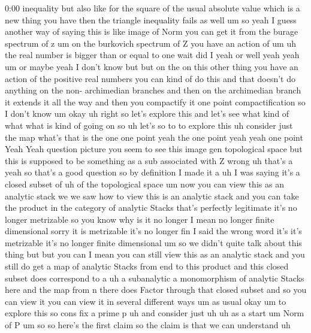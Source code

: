 \begin{unfinished}{0:00}
inequality  but  also  like  for  the  square
of  the  usual  absolute  value  which  is  a
new  thing  you  have  then  the  triangle
inequality  fails  as
well  um  so  yeah  I  guess  another  way  of
saying  this  is  like  image  of  Norm  you
can  get  it  from  the  burage  spectrum  of  z
um  on  the  burkovich  spectrum  of  Z  you
have  an  action  of
um  uh  the  real  number  is  bigger  than  or
equal  to  one  wait  did  I  yeah  or
well  yeah
yeah
um  or  maybe  yeah  I  don't  know  but  but  on
the  on  this  other  thing  you  have  an
action  of  the  positive  real  numbers  you
can  kind  of  do  this  and  that  doesn't  do
anything  on  the  non-  archimedian
branches  and  then  on  the  archimedian
branch  it  extends  it  all  the  way  and
then  you  compactify  it  one  point
compactification  so  I  don't  know
um  okay
uh  right  so  let's  explore  this  and  let's
see  what  kind
of  what  what  is  kind  of  going  on  so  uh
let's  so  to  to  explore
this  uh
consider  just  the
map  what's  that  is  the
one  one  point  yeah  the  one  point  yeah
yeah  one  point  Yeah
Yeah
question  picture  you  seem  to  see  this
image  gen  topological  space  but  this  is
supposed  to  be  something  as  a
sub  associated  with  Z  wrong  uh  that's  a
yeah  so  that's  a  good  question  so  by
definition  I  made  it  a  uh  I  was  saying
it's  a  closed  subset  of  uh  of  the
topological
space  um
now  you  can  view  this  as  an  analytic
stack  we  we  saw  how  to  view  this  is  an
analytic  stack  and  you  can  take  the
product  in  the  category  of  analytic
Stacks  that's  perfectly  legitimate  it's
no  longer  metrizable  so  you
know  why  is  it  no  longer  I  mean  no
longer  finite  dimensional  sorry  it  is
metrizable  it's  no  longer  fin  I  said  the
wrong  word  it's  it's  metrizable  it's  no
longer  finite  dimensional  um  so  we
didn't  quite  talk  about  this  thing  but
but  you  can  I  mean  you  can  still  view
this  as  an  analytic  stack  and  you  still
do  get  a  map  of  analytic  Stacks  from  end
to  this  product  and  this  closed  subset
does  correspond  to
a  uh  a  subanalytic  a  monomorphism  of
analytic  Stacks  here  and  the  map  from  n
there  does  Factor  through  that  closed
subset  and  so  you  can  view  it  you  can
view  it  in  several  different  ways  um  as
usual  okay  um  to  explore  this  so  cons
fix  a  prime
p  uh  and  consider  just
uh  uh  as  a  start
um  Norm  of
P
um  so  so  here's  the  first
claim  so  the  claim  is  that  we  can
understand  uh

\end{unfinished}
